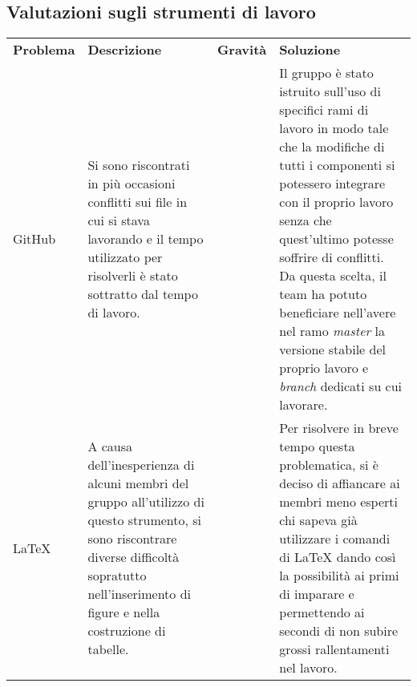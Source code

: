 \subsection{Valutazioni sugli strumenti di lavoro}
\begin{table}[H]
	\renewcommand{\arraystretch}{1.5}
	\caption{Tabella delle problematiche relative agli strumenti di lavoro}	
	\begin{longtable}{ >{\centering}p{} >{}p{}
			>{\centering}p{} >{}p{}}
			
		\rowcolorhead
		\textbf{\color{white}Problema} 
		& \textbf{\color{white}Descrizione} 
		& \centering\textbf{\color{white}Gravità}
		& \textbf{\color{white}Soluzione} 
		\tabularnewline %
		
		GitHub & 
		Si sono riscontrati in più occasioni conflitti sui file in cui si
		stava lavorando e il tempo utilizzato per risolverli è stato sottratto dal tempo
		di lavoro. &
		2 &
		Il gruppo è stato istruito sull'uso di specifici rami di lavoro in modo tale che
		la modifiche di tutti i componenti si potessero integrare con il proprio lavoro 
		senza che quest'ultimo potesse soffrire di conflitti. Da questa scelta, il team
		ha potuto beneficiare nell'avere nel ramo \textit{master} la versione stabile 
		del proprio lavoro e \textit{branch} dedicati su cui lavorare.
						
		\tabularnewline 
		\LaTeX{} &
		A causa dell'inesperienza di alcuni membri del gruppo all'utilizzo di questo
		strumento, si sono riscontrare diverse difficoltà sopratutto nell'inserimento 
		di figure e nella costruzione di tabelle. &
		1 &
		Per risolvere in breve tempo questa problematica, si è deciso di affiancare
		ai membri meno esperti chi sapeva già utilizzare i comandi di \LaTeX{} dando
		così la possibilità ai primi di imparare e permettendo ai secondi di non 
		subire grossi rallentamenti nel lavoro.
		
			
	\end{longtable}
	
\end{table}

